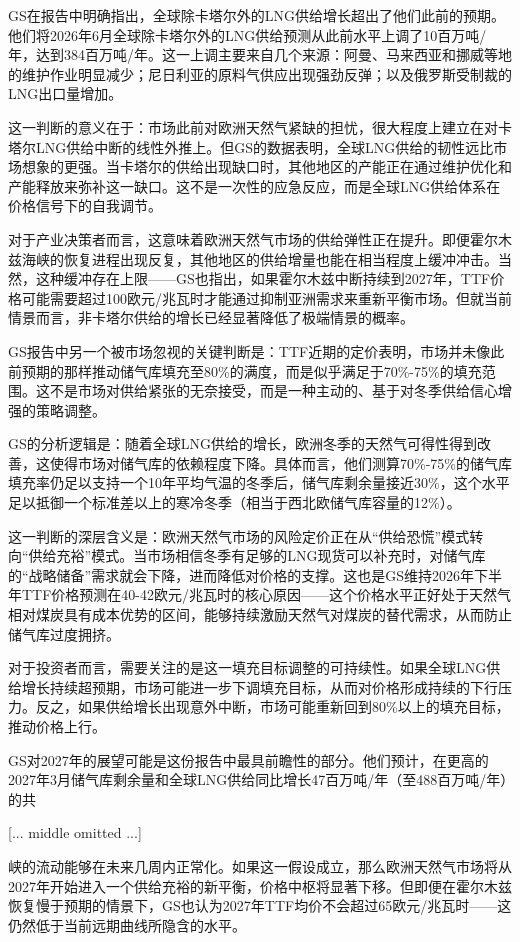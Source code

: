 \documentclass[11pt]{ctexart}
\begin{document}
GS在报告中明确指出，全球除卡塔尔外的LNG供给增长超出了他们此前的预期。他们将2026年6月全球除卡塔尔外的LNG供给预测从此前水平上调了10百万吨/年，达到384百万吨/年。这一上调主要来自几个来源：阿曼、马来西亚和挪威等地的维护作业明显减少；尼日利亚的原料气供应出现强劲反弹；以及俄罗斯受制裁的LNG出口量增加。

这一判断的意义在于：市场此前对欧洲天然气紧缺的担忧，很大程度上建立在对卡塔尔LNG供给中断的线性外推上。但GS的数据表明，全球LNG供给的韧性远比市场想象的更强。当卡塔尔的供给出现缺口时，其他地区的产能正在通过维护优化和产能释放来弥补这一缺口。这不是一次性的应急反应，而是全球LNG供给体系在价格信号下的自我调节。

对于产业决策者而言，这意味着欧洲天然气市场的供给弹性正在提升。即便霍尔木兹海峡的恢复进程出现反复，其他地区的供给增量也能在相当程度上缓冲冲击。当然，这种缓冲存在上限——GS也指出，如果霍尔木兹中断持续到2027年，TTF价格可能需要超过100欧元/兆瓦时才能通过抑制亚洲需求来重新平衡市场。但就当前情景而言，非卡塔尔供给的增长已经显著降低了极端情景的概率。

GS报告中另一个被市场忽视的关键判断是：TTF近期的定价表明，市场并未像此前预期的那样推动储气库填充至80\%的满度，而是似乎满足于70\%-75\%的填充范围。这不是市场对供给紧张的无奈接受，而是一种主动的、基于对冬季供给信心增强的策略调整。

GS的分析逻辑是：随着全球LNG供给的增长，欧洲冬季的天然气可得性得到改善，这使得市场对储气库的依赖程度下降。具体而言，他们测算70\%-75\%的储气库填充率仍足以支持一个10年平均气温的冬季后，储气库剩余量接近30\%，这个水平足以抵御一个标准差以上的寒冷冬季（相当于西北欧储气库容量的12\%）。

这一判断的深层含义是：欧洲天然气市场的风险定价正在从“供给恐慌”模式转向“供给充裕”模式。当市场相信冬季有足够的LNG现货可以补充时，对储气库的“战略储备”需求就会下降，进而降低对价格的支撑。这也是GS维持2026年下半年TTF价格预测在40-42欧元/兆瓦时的核心原因——这个价格水平正好处于天然气相对煤炭具有成本优势的区间，能够持续激励天然气对煤炭的替代需求，从而防止储气库过度拥挤。

对于投资者而言，需要关注的是这一填充目标调整的可持续性。如果全球LNG供给增长持续超预期，市场可能进一步下调填充目标，从而对价格形成持续的下行压力。反之，如果供给增长出现意外中断，市场可能重新回到80\%以上的填充目标，推动价格上行。

GS对2027年的展望可能是这份报告中最具前瞻性的部分。他们预计，在更高的2027年3月储气库剩余量和全球LNG供给同比增长47百万吨/年（至488百万吨/年）的共

[... middle omitted ...]

峡的流动能够在未来几周内正常化。如果这一假设成立，那么欧洲天然气市场将从2027年开始进入一个供给充裕的新平衡，价格中枢将显著下移。但即便在霍尔木兹恢复慢于预期的情景下，GS也认为2027年TTF均价不会超过65欧元/兆瓦时——这仍然低于当前远期曲线所隐含的水平。
\end{document}
